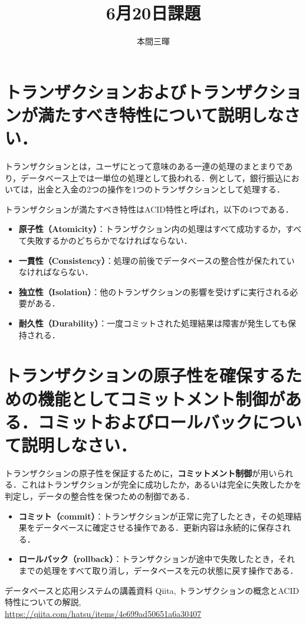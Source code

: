 \documentclass[titlepage,a4paper]{jsarticle}
\title{6月20日課題}
\author{本間三暉}
\begin{document}
\maketitle
\section{トランザクションおよびトランザクションが満たすべき特性について説明しなさい．}

トランザクションとは，ユーザにとって意味のある一連の処理のまとまりであり，データベース上では一単位の処理として扱われる．例として，銀行振込においては，出金と入金の2つの操作を1つのトランザクションとして処理する．

トランザクションが満たすべき特性はACID特性と呼ばれ，以下の4つである．
\begin{itemize}
  \item \textbf{原子性（Atomicity）}：トランザクション内の処理はすべて成功するか，すべて失敗するかのどちらかでなければならない．
  \item \textbf{一貫性（Consistency）}：処理の前後でデータベースの整合性が保たれていなければならない．
  \item \textbf{独立性（Isolation）}：他のトランザクションの影響を受けずに実行される必要がある．
  \item \textbf{耐久性（Durability）}：一度コミットされた処理結果は障害が発生しても保持される．
\end{itemize}

\section{トランザクションの原子性を確保するための機能としてコミットメント制御がある．コミットおよびロールバックについて説明しなさい．}

トランザクションの原子性を保証するために，\textbf{コミットメント制御}が用いられる．これはトランザクションが完全に成功したか，あるいは完全に失敗したかを判定し，データの整合性を保つための制御である．

\begin{itemize}
  \item \textbf{コミット（commit）}：トランザクションが正常に完了したとき，その処理結果をデータベースに確定させる操作である．更新内容は永続的に保存される．
  \item \textbf{ロールバック（rollback）}：トランザクションが途中で失敗したとき，それまでの処理をすべて取り消し，データベースを元の状態に戻す操作である．
\end{itemize}

\begin{thebibliography}{99}
  \bibitem{}データベースと応用システムの講義資料
  Qiita, トランザクションの概念とACID特性についての解説,\\
  \url{https://qiita.com/hatsu/items/4e699ad50651a6a30407}
\end{thebibliography}
\end{document}
